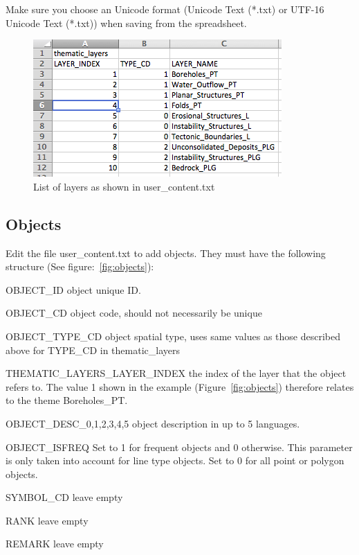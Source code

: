 \documentclass[a4paper, 12pt]{article}
\begin{document}
Make sure you choose an Unicode format (Unicode Text (*.txt) or UTF-16 Unicode Text (*.txt)) when saving from the spreadsheet.

\begin{figure} [hbp]
	\centering
    \includegraphics[width=.6\textwidth]{img/layers.png}
    \caption{List of layers as shown in user\_content.txt}
    \label{fig:layers}
\end{figure}

\subsection{Objects}
\label{sec:objects}

Edit the file user\_content.txt to add objects. They must have the following structure (See figure:~\ref{fig:objects}):
\begin{description*}
  \item [OBJECT\_ID] object unique ID.
  \item [OBJECT\_CD] object code, should not necessarily be unique
  \item [OBJECT\_TYPE\_CD] object spatial type, uses same values as those described above for TYPE\_CD in thematic\_layers
  \item [THEMATIC\_LAYERS\_LAYER\_INDEX] the index of the layer that the object refers to. The value 1 shown in the example (Figure~\ref{fig:objects}) therefore relates to the theme Boreholes\_PT.
  \item [OBJECT\_DESC\_0,1,2,3,4,5] object description in up to 5 languages.
  \item [OBJECT\_ISFREQ] Set to 1 for frequent objects and 0 otherwise. This parameter is only taken into account for line type objects. Set to 0 for all point or polygon objects.
  \item [SYMBOL\_CD] leave empty
  \item [RANK] leave empty
  \item [REMARK] leave empty
\end{description*}
\end{document}
